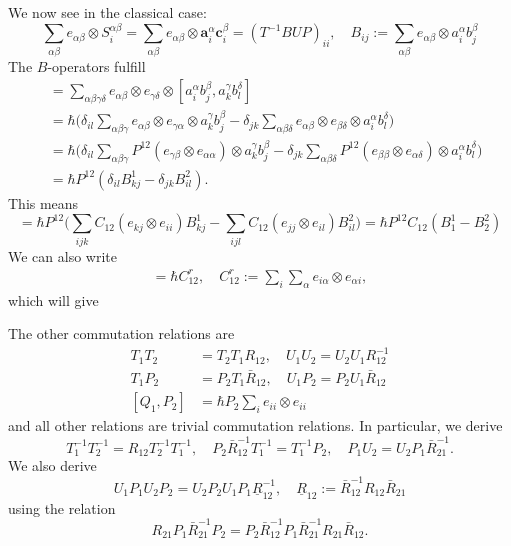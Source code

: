 \documentclass[11pt]{report}
\theoremstyle{definition}
\theoremstyle{remark}
\theoremstyle{remark}
\begin{document}
We now see in the classical case:
\begin{equation*}
\sum_{\alpha\beta} e_{\alpha\beta} \otimes S_i^{\alpha\beta} = \sum_{\alpha\beta} e_{\alpha\beta} \otimes \mathbf{a}_i^\alpha \mathbf{c}_i^\beta = (T^{-1} B U P)_{ii}, \quad B_{ij} := \sum_{\alpha\beta} e_{\alpha\beta} \otimes a_i^\alpha b_j^\beta
\end{equation*}
The $B$-operators fulfill
\begin{align*}
[B_{ij}^1,B_{kl}^2]
&= \sum_{\alpha\beta\gamma\delta} e_{\alpha\beta} \otimes e_{\gamma\delta} \otimes [a_i^\alpha b_j^\beta,a_k^\gamma b_l^\delta] \\
&= \hbar \bigg( \delta_{il} \sum_{\alpha\beta\gamma} e_{\alpha\beta} \otimes e_{\gamma\alpha} \otimes a_k^\gamma b_j^\beta
- \delta_{jk} \sum_{\alpha\beta\delta} e_{\alpha\beta} \otimes e_{\beta\delta} \otimes a_i^\alpha b_l^\delta \bigg) \\
&= \hbar \bigg( \delta_{il} \sum_{\alpha\beta\gamma} P^{12} (e_{\gamma\beta} \otimes e_{\alpha\alpha}) \otimes a_k^\gamma b_j^\beta
- \delta_{jk} \sum_{\alpha\beta\delta} P^{12}(e_{\beta\beta} \otimes e_{\alpha\delta}) \otimes a_i^\alpha b_l^\delta \bigg) \\
&= \hbar P^{12} (\delta_{il} B_{kj}^1 - \delta_{jk} B_{il}^2).
\end{align*}
This means
\begin{equation*}
[B_1^1,B_2^2] = \hbar P^{12} \bigg( \sum_{ijk} C_{12} (e_{kj} \otimes e_{ii}) B_{kj}^1 - \sum_{ijl} C_{12} (e_{jj} \otimes e_{il}) B_{il}^2 \bigg) = \hbar P^{12} C_{12} (B_1^1-B_2^2)
\end{equation*}
We can also write
\begin{align*}
[a_1,b_2] = \hbar C_{12}^r, \quad C_{12}^r := \sum_i \sum_\alpha e_{i\alpha} \otimes e_{\alpha i},
\end{align*}
which will give

The other commutation relations are
\begin{align*}
T_1 T_2 &= T_2 T_1 R_{12}, \quad U_1 U_2 = U_2 U_1 R_{12}^{-1} \\
T_1 P_2 &= P_2 T_1 \bar R_{12}, \quad U_1 P_2 = P_2 U_1 \bar R_{12} \\
[Q_1,P_2] &= \hbar P_2 \sum_i e_{ii} \otimes e_{ii}
\end{align*}
and all other relations are trivial commutation relations. In particular, we derive
\begin{equation*}
T_1^{-1} T_2^{-1} = R_{12} T_2^{-1} T_1^{-1}, \quad P_2 \bar R_{12}^{-1} T_1^{-1} = T_1^{-1} P_2, \quad P_1 U_2 = U_2 P_1 \bar R_{21}^{-1}.
\end{equation*}
We also derive
\begin{equation*}
U_1 P_1 U_2 P_2 = U_2 P_2 U_1 P_1 \underline{R}_{12}^{-1}, \quad \underline{R}_{12} := \bar R_{12}^{-1} R_{12} \bar R_{21}
\end{equation*}
using the relation
\begin{equation*}
R_{21} P_1 \bar R_{21}^{-1} P_2 = P_2 \bar R_{12}^{-1} P_1 \bar R_{21}^{-1} R_{21} \bar R_{12}.
\end{equation*}
\end{document}

